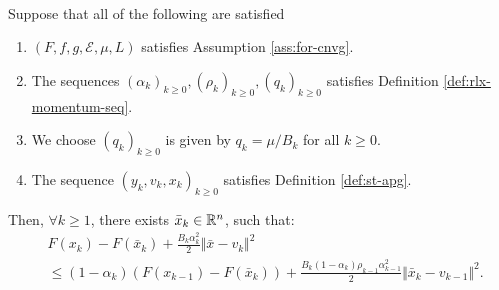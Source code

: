 \documentclass[12pt]{article}
\begin{document}
        \begin{lemma}\;\label{lemma:cnvg-prep-part3}\\
            Suppose that all of the following are satisfied
            \begin{enumerate}[nosep]
                \item $(F, f, g, \mathcal E, \mu, L)$ satisfies Assumption \ref{ass:for-cnvg}. 
                \item The sequences $(\alpha_k)_{k \ge 0}, (\rho_k)_{k \ge 0}, (q_k)_{k \ge 0}$ satisfies Definition \ref{def:rlx-momentum-seq}. 
                \item We choose $(q_k)_{k \ge 0}$ is given by $q_k = \mu/B_k$ for all $k \ge 0$. 
                \item The sequence $(y_k, v_k, x_k)_{k \ge 0}$ satisfies Definition \ref{def:st-apg}. 
            \end{enumerate}
            Then, $\forall k \ge 1$, there exists $\bar x_k \in \mathbb R^n$, such that: 
            \begin{align*}
                & F(x_k) - F(\bar x_k)
                + \frac{B_k\alpha_k^2}{2}\Vert \bar x - v_k\Vert^2 
                \\
                &\le 
                (1 - \alpha_k)(F(x_{k - 1}) - F(\bar x_k))
                + \frac{B_k(1 - \alpha_k)\rho_{k - 1}\alpha_{k - 1}^2}{2}\Vert \bar x_k - v_{k - 1}\Vert^2. 
            \end{align*}
        \end{lemma}
\end{document}
